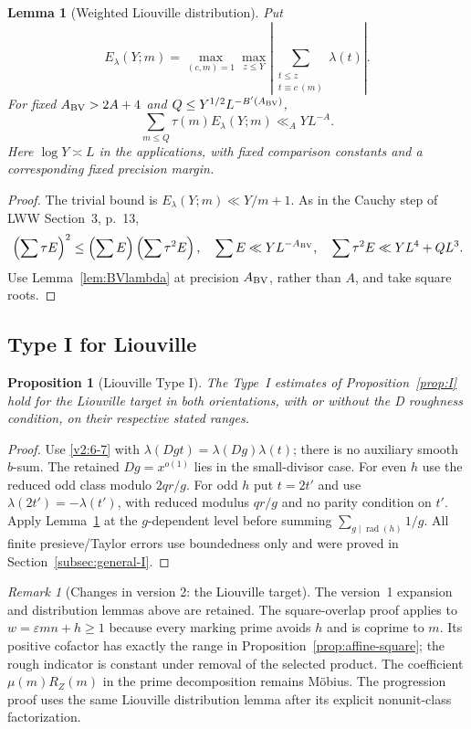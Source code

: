 \documentclass[11pt]{article}
\newtheorem{lemma}[theorem]{Lemma}
\newtheorem{proposition}[theorem]{Proposition}
\theoremstyle{definition}
\DeclareMathOperator{\rad}{rad}
\theoremstyle{remark}
\newtheorem{remark}[theorem]{Remark}
\numberwithin{equation}{section}
\begin{document}
\begin{lemma}[Weighted Liouville distribution]\label{lem:BVlambda-weighted}
Put
\[
 E_\lambda(Y;m)=\max_{(c,m)=1}\max_{z\le Y}
 \left|\sum_{\substack{t\le z\\t\equiv c\ (m)}}\lambda(t)\right|.
\]
For fixed $A_{\rm BV}>2A+4$ and
$Q\le Y^{1/2}L^{-B'(A_{\rm BV})}$,
\begin{equation}\label{eq:BVlambda-weighted}
 \sum_{m\le Q}\tau(m)E_\lambda(Y;m)\ll_A YL^{-A}.
\end{equation}
Here $\log Y\asymp L$ in the applications, with fixed comparison
constants and a corresponding fixed precision margin.
\end{lemma}
\begin{proof}
The trivial bound is $E_\lambda(Y;m)\ll Y/m+1$.
As in the Cauchy step of LWW Section~3, p.~13,
\begin{equation}\label{eq:BVlambda-Cauchy}
 \left(\sum\tau E\right)^2
 \le\left(\sum E\right)\left(\sum\tau^2E\right),\quad
 \sum E\ll YL^{-A_{\rm BV}},\quad
 \sum\tau^2E\ll YL^4+QL^3.
\end{equation}
Use Lemma~\ref{lem:BVlambda} at precision $A_{\rm BV}$, rather
than $A$, and take square roots.
\end{proof}

\subsection{Type I for Liouville}\label{subsec:lambda-typeI}
\begin{proposition}[Liouville Type I]\label{prop:lambda-I}
The Type~I estimates of Proposition~\ref{prop:I} hold for
the Liouville target in both orientations, with or without
the D roughness condition, on their respective stated ranges.
\end{proposition}
\begin{proof}
Use \eqref{v2:6-7} with $\lambda(Dgt)=\lambda(Dg)\lambda(t)$;
there is no auxiliary smooth $b$-sum. The retained $Dg=x^{o(1)}$
lies in the small-divisor case. For even $h$ use the reduced odd
class modulo $2qr/g$. For odd $h$ put $t=2t'$ and use
$\lambda(2t')=-\lambda(t')$, with reduced modulus $qr/g$
and no parity condition on $t'$.
Apply Lemma~\ref{lem:BVlambda-weighted} at the $g$-dependent
level before summing $\sum_{g\mid\rad(h)}1/g$.
All finite presieve/Taylor errors use boundedness only and were
proved in Section~\ref{subsec:general-I}.
\end{proof}
\begin{remark}[Changes in version 2: the Liouville target]
The version~1 expansion and distribution lemmas above are retained.
The square-overlap proof applies to
$w=\varepsilon mn+h\ge1$ because every marking prime avoids $h$
and is coprime to $m$. Its positive cofactor has exactly the range
in Proposition~\ref{prop:affine-square}; the rough indicator is
constant under removal of the selected product. The coefficient
$\mu(m)R_Z(m)$ in the prime decomposition remains M\"obius.
The progression proof uses the same Liouville distribution lemma
after its explicit nonunit-class factorization.
\end{remark}
\end{document}
